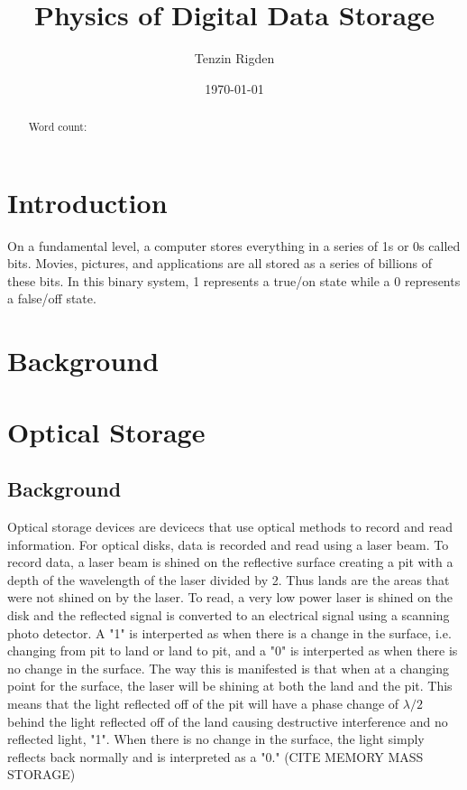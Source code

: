 \documentclass[ aip, 12pt]{revtex4-1} %
\begin{document}
\title{Physics of Digital Data Storage}
\author{Tenzin Rigden}
\date{\today}

\begin{abstract}
Word count: 
\end{abstract}

\maketitle
\section{Introduction}
On a fundamental level, a computer stores everything in a series of 1s or 0s called bits. Movies, pictures, and applications are all stored as a series of billions of these bits. In this binary system, 1 represents a true/on state while a 0 represents a false/off state. 
\section{Background}


\section{Optical Storage}
\subsection{Background}
Optical storage devices are devicecs that use optical methods to record and read information. For optical disks, data is recorded and read using a laser beam. To record data, a laser beam is shined on the reflective surface creating a pit with a depth of the wavelength of the laser divided by 2. Thus lands are the areas that were not shined on by the laser. To read, a very low power laser is shined on the disk and the reflected signal is converted to an electrical signal using a scanning photo detector. A "1" is interperted as when there is a change in the surface, i.e. changing from pit to land or land to pit, and a "0" is interperted as when there is no change in the surface. The way this is manifested is that when at a changing point for the surface, the laser will be shining at both the land and the pit. This means that the light reflected off of the pit will have a phase change of $\lambda/2$ behind the light reflected off of the land causing destructive interference and no reflected light, "1". When there is no change in the surface, the light simply reflects back normally and is interpreted as a "0." (CITE MEMORY MASS STORAGE)
\end{document}
